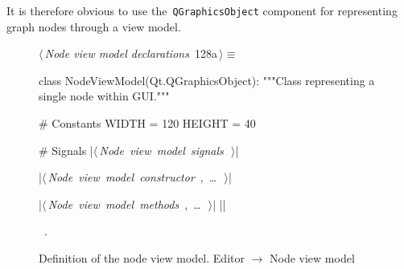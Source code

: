 \documentclass[%
    a4paper,    %
    justified,  %
    nobib,      %
    openany     %
]{tufte-book}
\makeatletter
\renewcommand{\label}[1]{\@tufte@label{##1}}%
\makeatother
\begin{document}
It is therefore obvious to use the~\verb=QGraphicsObject= component
for representing graph nodes through a view model.

\begin{figure}[!htbp]
\begin{flushleft} \small
\begin{minipage}{\linewidth}\label{scrap67}\raggedright\small
{} $\langle\,${\itshape Node view model declarations}\nobreak\ {\footnotesize {128a}}$\,\rangle\equiv$
\vspace{-1ex}
\begin{pythoncode}
class NodeViewModel(Qt.QGraphicsObject):
    """Class representing a single node within GUI."""

    # Constants
    WIDTH = 120
    HEIGHT = 40

    # Signals
    |\hbox{$\langle\,${\itshape Node view model signals}\nobreak\ {\footnotesize {}}$\,\rangle$}|

    |\hbox{$\langle\,${\itshape Node view model constructor}\nobreak\ {\footnotesize {}, \ldots\ }$\,\rangle$}|

    |\hbox{$\langle\,${\itshape Node view model methods}\nobreak\ {\footnotesize {}, \ldots\ }$\,\rangle$}|
|\NWsep|
\end{pythoncode}
\vspace{1.5ex}
\footnotesize
\begin{list}{}{\setlength{\itemsep}{-\parsep}\setlength{\itemindent}{-\leftmargin}}
\item \NWtxtMacroRefIn\ .

\item{}
\end{list}
\end{minipage}\vspace{4ex}
\end{flushleft}
\caption{Definition of the node view model.
  \newline{}\newline{}Editor $\rightarrow$ Node view model}
\end{figure}
\end{document}

